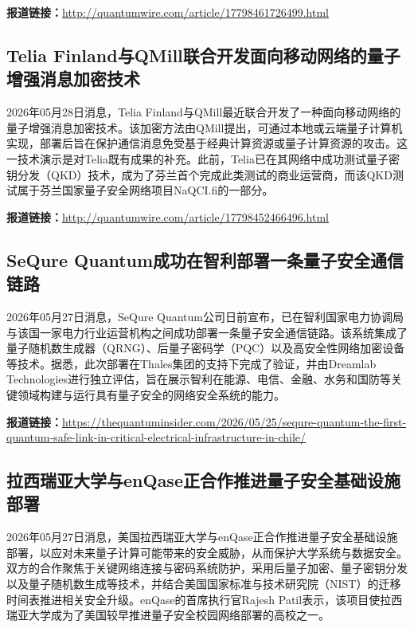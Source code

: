 \documentclass[12pt,a4paper]{ctexart}
\begin{document}
\noindent\textbf{报道链接：}\url{http://quantumwire.com/article/17798461726499.html}

\subsection{ Telia Finland与QMill联合开发面向移动网络的量子增强消息加密技术 }

2026年05月28日消息，Telia Finland与QMill最近联合开发了一种面向移动网络的量子增强消息加密技术。该加密方法由QMill提出，可通过本地或云端量子计算机实现，部署后旨在保护通信消息免受基于经典计算资源或量子计算资源的攻击。这一技术演示是对Telia既有成果的补充。此前，Telia已在其网络中成功测试量子密钥分发（QKD）技术，成为了芬兰首个完成此类测试的商业运营商，而该QKD测试属于芬兰国家量子安全网络项目NaQCI.fi的一部分。

\noindent\textbf{报道链接：}\url{http://quantumwire.com/article/17798452466496.html}

\subsection{ SeQure Quantum成功在智利部署一条量子安全通信链路 }

2026年05月27日消息，SeQure Quantum公司日前宣布，已在智利国家电力协调局与该国一家电力行业运营机构之间成功部署一条量子安全通信链路。该系统集成了量子随机数生成器（QRNG）、后量子密码学（PQC）以及高安全性网络加密设备等技术。据悉，此次部署在Thales集团的支持下完成了验证，并由Dreamlab Technologies进行独立评估，旨在展示智利在能源、电信、金融、水务和国防等关键领域构建与运行具有量子安全的网络安全系统的能力。

\noindent\textbf{报道链接：}\url{https://thequantuminsider.com/2026/05/25/sequre-quantum-the-first-quantum-safe-link-in-critical-electrical-infrastructure-in-chile/}

\subsection{ 拉西瑞亚大学与enQase正合作推进量子安全基础设施部署 }

2026年05月27日消息，美国拉西瑞亚大学与enQase正合作推进量子安全基础设施部署，以应对未来量子计算可能带来的安全威胁，从而保护大学系统与数据安全。双方的合作聚焦于关键网络连接与密码系统防护，采用后量子加密、量子密钥分发以及量子随机数生成等技术，并结合美国国家标准与技术研究院（NIST）的迁移时间表推进相关安全升级。enQase的首席执行官Rajesh Patil表示，该项目使拉西瑞亚大学成为了美国较早推进量子安全校园网络部署的高校之一。
\end{document}
